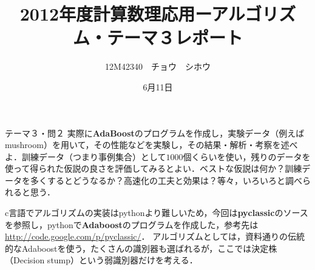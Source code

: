 \documentclass[a4paper,11pt]{jsarticle}
\title{2012年度計算数理応用ーアルゴリズム・テーマ３レポート}
\author{12M42340　チョウ　シホウ}
\date{6月11日}
\numberwithin{theorem}{section}  %
\numberwithin{equation}{section} %
\begin{document}
{}
\renewcommand{\thepart}{\arabic{part}}

\begin{itembox}[l]{テーマ３・問２}
実際に{\bf AdaBoost}のプログラムを作成し，実験データ（例えばmushroom）を用いて，その性能などを実験し，その結果・解析・考察を述べよ．訓練データ（つまり事例集合）として$1000$個くらいを使い，残りのデータを使って得られた仮説の良さを評価してみるとよい．ベストな仮説は何か？訓練データを多くするとどうなるか？高速化の工夫と効果は？等々，いろいろと調べられると思う．
\end{itembox}

c言語でアルゴリズムの実装はpythonより難しいため，今回は{\bf pyclassic}のソースを参照し，pythonで{\bf Adaboost}のプログラムを作成した，参考先は\url{http://code.google.com/p/pyclassic/}．
アルゴリズムとしては，資料通りの伝統的なAdaboostを使う，たくさんの識別器も選ばれるが，ここでは決定株（Decision stump）という弱識別器だけを考える．
\end{document}

